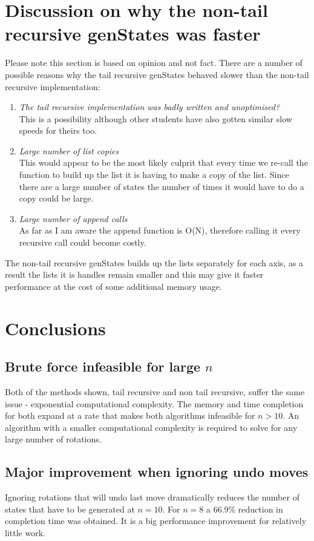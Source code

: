 \documentclass[]{article}
\begin{document}
\section{Discussion on why the non-tail recursive genStates was faster}
Please note this section is based on opinion and not fact. There are a number of possible reasons why the tail recursive genStates behaved slower than the non-tail recursive implementation:
\begin{enumerate}
	\item \textit{The tail recursive implementation was badly written and unoptimised?}\\This is a possibility although other students have also gotten similar slow speeds for theirs too.
	\item \textit{Large number of list copies} \\ This would appear to be the most likely culprit that every time we re-call the function to build up the list it is having to make a copy of the list. Since there are a large number of states the number of times it would have to do a copy could be large.
	\item \textit{Large number of append calls}\\ As far as I am aware the append function is O(N), therefore calling it every recursive call could become costly.
\end{enumerate}
The non-tail recursive genStates builds up the lists separately for each axis, as a result the lists it is handles remain smaller and this may give it faster performance at the cost of some additional memory usage.
\section{Conclusions}
\subsection{Brute force infeasible for large \(n\)}
 Both of the methods shown, tail recursive and non tail recursive, suffer the same issue - exponential computational complexity. The memory and time completion for both expand at a rate that makes both algorithms infeasible for \(n>10\). An algorithm with a smaller computational complexity is required to solve for any large number of rotations.
\subsection{Major improvement when ignoring undo moves}
Ignoring rotations that will undo last move dramatically reduces the number of states that have to be generated at \(n = 10\). For \(n = 8\) a 66.9\% reduction in completion time was obtained. It is a big performance improvement for relatively little work.
\end{document}
